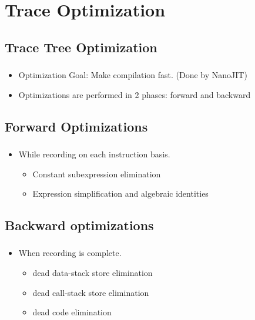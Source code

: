 \documentclass[mathserif,10pt]{beamer}
\begin{document}
\section{Trace  Optimization}
\subsection{Trace Tree Optimization}
\frame
{
  \frametitle{\subsecname}
  \begin{itemize}
    \item Optimization Goal: Make compilation fast. (Done by NanoJIT)
    \item Optimizations are performed in 2 phases: forward and backward 
  \end{itemize}     
}

\subsection{Forward Optimizations}
\frame
{
  \frametitle{\subsecname}
  \begin{itemize}
    \item While recording on each instruction basis.
      \begin{itemize}
        \item Constant subexpression elimination
        \item Expression simplification and algebraic identities
      \end{itemize}  
  \end{itemize}  
}
\subsection{Backward optimizations}
\frame
{
  \frametitle{\subsecname}
  \begin{itemize}
    \item When recording is complete.
    \begin{itemize}
      \item dead data-stack store elimination
      \item dead call-stack store elimination
      \item dead code elimination
    \end{itemize}  
  \end{itemize}    
}
\end{document}

